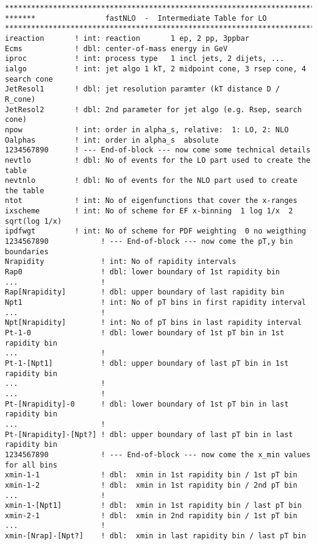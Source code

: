 {\small \footnotesize
\begin{verbatim} 
******************************************************************************
*******                fastNLO  -  Intermediate Table for LO
******************************************************************************
ireaction       ! int: reaction       1 ep, 2 pp, 3ppbar
Ecms            ! dbl: center-of-mass energy in GeV
iproc           ! int: process type   1 incl jets, 2 dijets, ...
ialgo           ! int: jet algo 1 kT, 2 midpoint cone, 3 rsep cone, 4 search cone 
JetResol1       ! dbl: jet resolution paramter (kT distance D / R_cone)
JetResol2       ! dbl: 2nd parameter for jet algo (e.g. Rsep, search cone)
npow            ! int: order in alpha_s, relative:  1: LO, 2: NLO
Oalphas         ! int: order in alpha_s  absolute
1234567890      ! --- End-of-block --- now come some technical details
nevtlo          ! dbl: No of events for the LO part used to create the table
nevtnlo         ! dbl: No of events for the NLO part used to create the table
ntot            ! int: No of eigenfunctions that cover the x-ranges 
ixscheme        ! int: No of scheme for EF x-binning  1 log 1/x  2 sqrt(log 1/x)
ipdfwgt         ! int: No of scheme for PDF weighting  0 no weigthing
1234567890            ! --- End-of-block --- now come the pT,y bin boundaries
Nrapidity             ! int: No of rapidity intervals
Rap0                  ! dbl: lower boundary of 1st rapidity bin
...                   !
Rap[Nrapidity]        ! dbl: upper boundary of last rapidity bin
Npt1                  ! int: No of pT bins in first rapidity interval
...                   !
Npt[Nrapidity]        ! int: No of pT bins in last rapidity interval
Pt-1-0                ! dbl: lower boundary of 1st pT bin in 1st rapidity bin
...                   !
Pt-1-[Npt1]           ! dbl: upper boundary of last pT bin in 1st rapidity bin
...                   !
...                   !
Pt-[Nrapidity]-0      ! dbl: lower boundary of 1st pT bin in last rapidity bin
...                   ! 
Pt-[Nrapidity]-[Npt?] ! dbl: upper boundary of last pT bin in last rapidity bin
1234567890            ! --- End-of-block --- now come the x_min values for all bins
xmin-1-1              ! dbl:  xmin in 1st rapidity bin / 1st pT bin
xmin-1-2              ! dbl:  xmin in 1st rapidity bin / 2nd pT bin
...                   !
xmin-1-[Npt1]         ! dbl:  xmin in 1st rapidity bin / last pT bin
xmin-2-1              ! dbl:  xmin in 2nd rapidity bin / 1st pT bin
...                   !
xmin-[Nrap]-[Npt?]    ! dbl:  xmin in last rapidity bin / last pT bin

\end{verbatim}}
